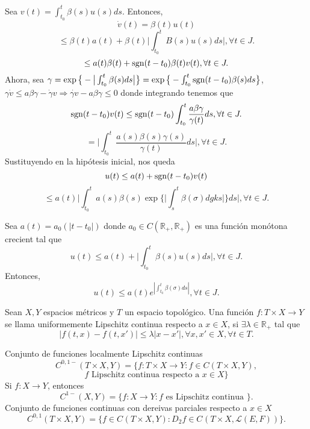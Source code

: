 \begin{dem}
  Sea $v(t) = \int_{t_{0}}^{t} \beta(s) u(s) ds$. Entonces,
  \[ 
    \dot{v}(t) = \beta(t) u(t) 
  \] 
  \[ 
    \leq \beta(t) a(t) + \beta(t) \Big | \int_{t_{0}}^{t} B(s) u(s)  ds \Big |, \forall t \in J.
  \] 
  \[ 
    \leq a(t) \beta(t) + \operatorname{sgn}(t - t_{0}) \beta(t) v(t), \forall t \in J.
  \] 
  Ahora, sea $\gamma = \exp \big\{ - \big | \int_{t_{0}}^{t} \beta(s) ds \big | \big\} = \exp \big\{ - \int_{t_{0}}^{t} \operatorname{sgn} (t - t_{0}) \beta(s) ds \big\} $,
  $\gamma \dot{v} \leq a \beta \gamma - \dot{\gamma} v \Rightarrow \dot{\gamma v} - a \beta \gamma \leq 0$ donde integrando tenemos que
  \[ 
    \operatorname{sgn}(t-t_{0}) v(t) \leq \operatorname{sgn}(t -t_{0}) \int_{t_{0}}^{t} \frac{a \beta \gamma }{\gamma(t)} ds , \forall t \in J.
  \] 
  \[ 
    = \Big | \int_{t_{0}}^{t} \frac{a(s) \beta(s) \gamma(s)}{\gamma(t)} ds \Big |, \forall t \in J. 
  \] 
  Sustituyendo en la hipótesis inicial, nos queda
  \[ 
     u(t) \leq a(t) + \operatorname{sgn}(t -t_{0})v(t)
  \] 
  \[ 
    \leq a(t) \Big | \int_{t_{0}}^{t} a(s) \beta(s) \exp \Big\{ \Big | \int_{s}^{t} \beta(\sigma) dgks \Big | \Big\} ds \Big |, \forall t \in J.
  \] 
\end{dem}

\begin{cor}
  Sea $a(t) = a_{0}(| t -  t_{0} |)$ donde $a_{0} \in C(\mathbb{R}_{+}, \mathbb{R}_{+})$ es una función monótona crecient tal que
  \[ 
    u(t) \leq a(t) + \Big | \int_{t_{0}}^{t} \beta(s) u(s) ds \Big |, \forall t \in J. 
  \]
  Entonces, 
  \[ 
    u(t) \leq a(t) e^{| \int_{t_{0}}^{t} \beta(\sigma) ds |}, \forall t \in J. 
  \] 
\end{cor}

\begin{defn}
  Sean $X, Y$ espacios métricos y $T$ un espacio topológico. Una función $f: T \times X \to Y$ se llama uniformemente Lipschitz continua respecto a $x \in X$, si $\exists \lambda \in \mathbb{R}_{+}$ tal que 
  \[ 
    | f(t,x) - f(t,x') | \leq \lambda | x - x' |, \forall x,x' \in X, \forall t \in T. 
  \] 
\end{defn}

\begin{nota}
  Conjunto de funciones localmente Lipschitz continuas
  \[ 
    C^{0,1-}(T \times X, Y) = \{ f: T \times X \to Y : f \in C(T \times X, Y),
  \] 
  \[ 
     f \text{ Lipschitz continua respecto a } x \in X \}  
  \] 
  Si $f: X \to Y$, entonces
  \[ 
    C^{1-}(X,Y) = \{ f: X \to Y : f \text{ es Lipschitz continua } \} .
  \]
  Conjunto de funciones continuas con dereivas parciales respecto a $x \in X$
  \[ 
    C^{0,1}(T \times X, Y) = \{ f \in C^{}(T \times X, Y) : D_{2}f \in C^{}(T \times X, \mathcal{L}(E,F)) \}.
  \] 
\end{nota}

